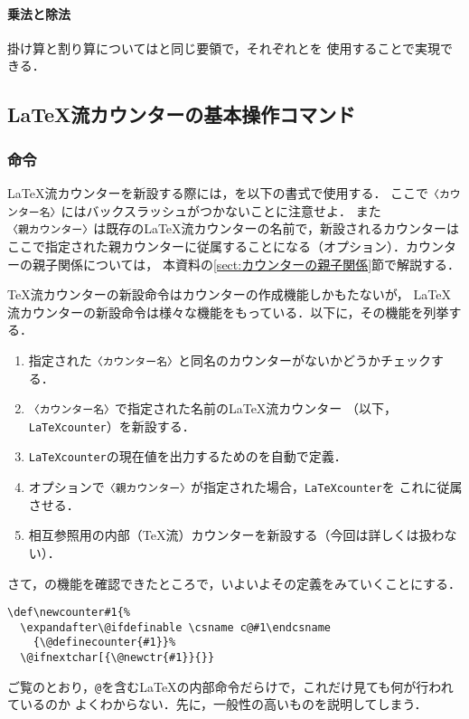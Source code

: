 \documentclass[autodetect-engine,dvipdfmx]{jsarticle}
\begin{document}
\paragraph{乗法と除法}
掛け算と割り算についてはと同じ要領で，それぞれとを
使用することで実現できる．

\subsection{\LaTeX 流カウンターの基本操作コマンド}

\subsubsection{命令}

\LaTeX 流カウンターを新設する際には，を以下の書式で使用する．
ここで\texttt{〈カウンター名〉}にはバックスラッシュがつかないことに注意せよ．
また\texttt{〈親カウンター〉}は既存の\LaTeX 流カウンターの名前で，新設されるカウンターは
ここで指定された親カウンターに従属することになる（オプション）．カウンターの親子関係については，
本資料の\ref{sect:カウンターの親子関係}節で解説する．

\TeX 流カウンターの新設命令はカウンターの作成機能しかもたないが，
\LaTeX 流カウンターの新設命令は様々な機能をもっている．以下に，その機能を列挙する．
\begin{enumerate}
\item 指定された\texttt{〈カウンター名〉}と同名のカウンターがないかどうかチェックする．
\item \texttt{〈カウンター名〉}で指定された名前の\LaTeX 流カウンター
	（以下，\texttt{LaTeXcounter}）を新設する．
\item \texttt{LaTeXcounter}の現在値を出力するためのを自動で定義．
\item オプションで\texttt{〈親カウンター〉}が指定された場合，\texttt{LaTeXcounter}を
	これに従属させる．
\item 相互参照用の内部（\TeX 流）カウンターを新設する（今回は詳しくは扱わない）．
\end{enumerate}

さて，の機能を確認できたところで，いよいよその定義をみていくことにする．
\latexltx
\begin{lstlisting}[firstnumber=1819]
\def\newcounter#1{%
  \expandafter\@ifdefinable \csname c@#1\endcsname
    {\@definecounter{#1}}%
  \@ifnextchar[{\@newctr{#1}}{}}
\end{lstlisting}
ご覧のとおり，\texttt{@}を含む\LaTeX の内部命令だらけで，これだけ見ても何が行われているのか
よくわからない．先に，一般性の高いものを説明してしまう．
\end{document}
